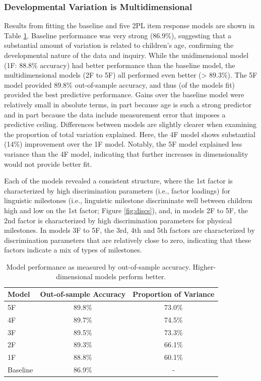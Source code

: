 \documentclass[man, floatsintext]{apa7}
\begin{document}
\subsubsection{Developmental Variation is
Multidimensional}\label{developmental-variation-is-multidimensional}

Results from fitting the baseline and five 2PL item response models are shown
in Table \ref{tab:study1results}. Baseline performance was very strong (86.9\%), suggesting that a substantial amount of variation is related to children's age, confirming the developmental nature of the data and inquiry. While the unidimensional model (1F:
88.8\% accuracy) had better performance than the baseline model, the
multidimensional models (2F to 5F) all performed even better
(\textgreater{} 89.3\%). The 5F model provided 89.8\% out-of-sample
accuracy, and thus (of the models fit) provided the best predictive
performance. Gains over the baseline model were relatively small in absolute terms, in part because age is such a strong predictor and in part because the data include measurement error that imposes a predictive ceiling. Differences between models are slightly clearer when examining the proportion of total variation explained. Here, the 4F model shows substantial (14\%) improvement over the 1F model. Notably, the 5F model explained less variance than the 4F model, indicating that further increases in dimensionality would not provide better fit.

Each of the models revealed a consistent structure, where the 1st factor is characterized by high discrimination parameters (i.e., factor loadings) for linguistic milestones (i.e., linguistic milestone discriminate well between children high and low on the 1st factor; Figure \ref{fig:discs}), and, in models 2F to 5F, the 2nd factor is characterized by high discrimination parameters for physical milestones. In models 3F to 5F, the 3rd, 4th and 5th factors are characterized by discrimination parameters that are relatively close to zero, indicating that these factors indicate a mix of types of milestones.

\begin{table}[!ht]
\caption{\label{tab:study1results}Model performance as measured by out-of-sample accuracy. Higher-dimensional models perform better.}
\centering
\begin{tabular}[t]{lcc}
\toprule
Model & Out-of-sample Accuracy & Proportion of Variance\\
\midrule
5F & 89.8\% & 73.0\% \\
4F & 89.7\% & 74.5\% \\
3F & 89.5\% & 73.3\% \\
2F & 89.3\% & 66.1\% \\
1F & 88.8\% & 60.1\% \\
Baseline & 86.9\% & - \\
\bottomrule
\end{tabular}
\end{table}
\end{document}
